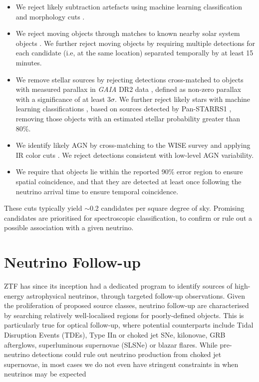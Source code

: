 \begin{itemize}
	\item We reject likely subtraction artefacts using machine learning classification and morphology cuts \cite{ztf_ml_19}.
	\item We reject moving objects through matches to known nearby solar system objects \cite{ztf_data_processing}. We further reject moving objects by requiring multiple  detections for each candidate (i.e, at the same location) separated temporally by at least 15 minutes.
	\item We remove stellar sources by rejecting detections cross-matched to objects with measured parallax in \textit{GAIA} DR2 data , defined as non-zero parallax with a significance of at least 3$\sigma$. We further reject likely stars with machine learning classifications , based on sources detected by Pan-STARRS1 \cite{panstarrs_16}, removing those objects with an estimated stellar probability greater than 80\%.
	\item We identify likely AGN by cross-matching to the WISE survey and applying IR color cuts \cite{2010AJ....140.1868W}. We reject detections consistent with low-level AGN variability. 
	\item We require that objects lie within the reported 90\% error region to ensure spatial coincidence, and that they are detected at least once following the neutrino arrival time to ensure temporal coincidence.
\end{itemize}

These cuts typically yield $\sim$0.2 candidates per square degree of sky. Promising candidates are prioritised for spectroscopic classification, to confirm or rule out a possible association with a given neutrino. 

\section{Neutrino Follow-up}
ZTF has since its inception had a dedicated program to identify sources of high-energy astrophysical neutrinos, through targeted follow-up observations. Given the proliferation of proposed source classes, neutrino follow-up are characterised by searching relatively well-localised regions for poorly-defined objects. This is particularly true for optical follow-up, where potential counterparts include Tidal Disruption Events (TDEs), Type IIn or choked jet SNe, kilonovae, GRB afterglows, superluminous supernovae (SLSNe) or blazar flares. While pre-neutrino detections could rule out neutrino production from choked jet supernovae, in most cases we do not even have stringent constraints in when neutrinos may be expected 

